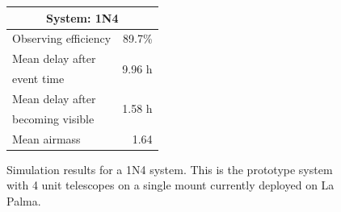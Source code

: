 \begin{colsection}
\begin{colsection}
\begin{figure}[p]
\begin{center}
\begin{minipage}[t]{0.35\textwidth}
\begin{tabular}{lr}
\multicolumn{2}{c}{\textbf{System: 1N4}} \\
\midrule
Observing efficiency & 89.7\% \\
\midrule
Mean delay after     & \multirow{2}{*}{9.96 h} \\
event time           & \\
Mean delay after     & \multirow{2}{*}{1.58 h} \\
becoming visible     & \\
\midrule
Mean airmass         & 1.64 \\
\end{tabular}
\vfill
\end{minipage}

\end{center}
\caption[GW simulation results: 1N4 system]{Simulation results for a 1N4 system. This is the prototype system with 4 unit telescopes on a single mount currently deployed on La Palma.
}
\label{fig:gw_sim_1n4}
\end{figure}


\begin{figure}[p]
    \begin{center}


\end{center}
\end{figure}
\end{colsection}
\end{colsection}
